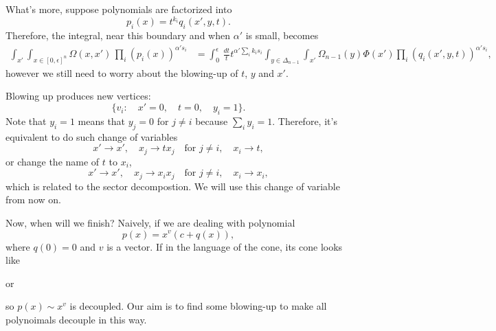 \documentclass[12pt]{article}
\theoremstyle{definition}
\theoremstyle{plain}
\begin{document}
What's more, suppose polynomials are factorized into
\[
	p_i(x) = t^{k_i}q_i(x',y,t).
\]
Therefore, the integral, near this boundary and when $\alpha'$ is small, becomes
\[
	\begin{aligned}
		\int_{x'} \int_{x\in [0,\epsilon]^n} \Omega(x,x')\, \prod_i(p_i(x))^{\alpha' s_i}
		&=
		\int_0^\epsilon \, \frac{dt}{t} t^{\alpha' \sum_i k_is_i}\int_{y\in\Delta_{n-1}}\int_{x'}\Omega_{n-1}(y)
		\Phi(x')\prod_i
		(q_i(x',y,t))^{\alpha' s_i},
	\end{aligned}
\]
however we still need to worry about the blowing-up of $t$, $y$ and $x'$.

Blowing up produces new vertices: 
\[
	\{v_i:\quad x'=0,\quad t=0,\quad y_i=1\}.
\]
Note that $y_i=1$ means that $y_j=0$ for $j\neq i$ because $\sum_i y_i=1$. Therefore, it's equivalent to 
do such change of variables
\[
	x'\to x',\quad x_j\to tx_j\quad \text{for $j\neq i$},\quad x_i\to t,
\]
or change the name of $t$ to $x_i$,
\[
	x'\to x',\quad x_j\to x_ix_j\quad \text{for $j\neq i$},\quad x_i\to x_i,
\]
which is related to the sector decompostion. We will use this change of variable from
now on.

Now, when will we finish? Naively, if we are dealing with polynomial 
\[
p(x)=x^v(c+q(x)),
\] 
where $q(0)=0$ and $v$ is a vector. If in the language of the cone, its cone looks like 
\begin{center}
\quad or \quad 
{}
\end{center}
so $p(x)\sim x^v$ is decoupled. Our aim is to find some blowing-up to make all polynoimals 
decouple in this way.
\end{document}
